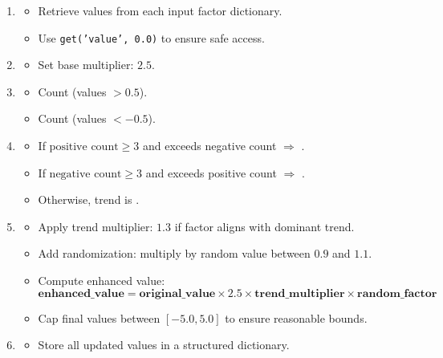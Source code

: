 \documentclass[3p,times,procedia]{elsarticle}
\begin{document}
 \cite{Harvey2016}
\begin{enumerate}
    \item {}
    \begin{itemize}
        \item Retrieve values from each input factor dictionary.
        \item Use \texttt{get('value', 0.0)} to ensure safe access.
    \end{itemize}

    \item {}
    \begin{itemize}
        \item Set base multiplier: $2.5$.
    \end{itemize}

    \item {}
    \begin{itemize}
        \item Count  (values $> 0.5$).
        \item Count  (values $< -0.5$).
    \end{itemize}

    \item {}
    \begin{itemize}
        \item If $\text{positive count} \geq 3$ and exceeds negative count $\Rightarrow$ .
        \item If $\text{negative count} \geq 3$ and exceeds positive count $\Rightarrow$ .
        \item Otherwise, trend is .
    \end{itemize}

    \item {}
    \begin{itemize}
        \item Apply trend multiplier: $1.3$ if factor aligns with dominant trend.
        \item Add randomization: multiply by random value between $0.9$ and $1.1$.
        \item Compute enhanced value: 
        \begin{equation}
\bm{\textbf{enhanced\_value} = \textbf{original\_value} \times 2.5 \times \textbf{trend\_multiplier} \times \textbf{random\_factor}}
\end{equation}

        \item Cap final values between $[-5.0, 5.0]$ to ensure reasonable bounds.
    \end{itemize}

    \item {}
    \begin{itemize}
        \item Store all updated values in a structured dictionary.
    \end{itemize}

\end{enumerate}
\end{document}
